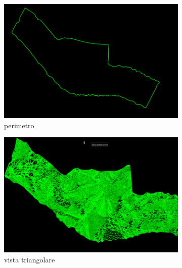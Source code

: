 \begin{figure}[h]
  \begin{subfigure}{.5\textwidth}
  \centering
    \includegraphics[width=0.8\linewidth]{Figures/perimetro}
    \caption{perimetro}
  \end{subfigure}%
  \begin{subfigure}{.5\textwidth}
  \centering
    \includegraphics[width=0.8\linewidth]{Figures/vista triangolare}
    \caption{vista triangolare}
  \end{subfigure}
  \caption{}
\end{figure}